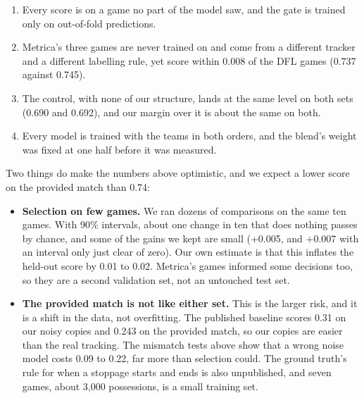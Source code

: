 \documentclass[10pt,a4paper]{article}
\begin{document}
\begin{enumerate}\setlength{\itemsep}{2pt}

\item Every score is on a game no part of the model saw, and the gate is trained only on
   out-of-fold predictions.

\item Metrica's three games are never trained on and come from a different tracker and a different
   labelling rule, yet score within 0.008 of the DFL games (0.737 against 0.745).

\item The control, with none of our structure, lands at the same level on both sets (0.690 and
   0.692), and our margin over it is about the same on both.

\item Every model is trained with the teams in both orders, and the blend's weight was fixed at one
   half before it was measured.

\end{enumerate}


Two things do make the numbers above optimistic, and we expect a lower score on the provided
match than 0.74:


\begin{itemize}\setlength{\itemsep}{2pt}

\item \textbf{Selection on few games.} We ran dozens of comparisons on the same ten games. With 90\%
  intervals, about one change in ten that does nothing passes by chance, and some of the gains we
  kept are small (+0.005, and +0.007 with an interval only just clear of zero). Our own estimate is that
  this inflates the held-out score by 0.01 to 0.02. Metrica's games informed some decisions too,
  so they are a second validation set, not an untouched test set.

\item \textbf{The provided match is not like either set.} This is the larger risk, and it is a shift in the data, not overfitting. The published baseline scores 0.31 on our noisy copies and 0.243 on the provided match, so our copies are easier than the real tracking. The mismatch tests above show that a wrong noise model costs 0.09 to 0.22, far more than selection could. The ground truth's rule for when a stoppage starts and ends is also unpublished, and seven games, about 3,000 possessions, is a small training set.

\end{itemize}
\end{document}
